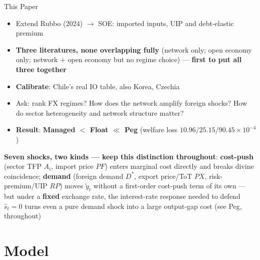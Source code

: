 \documentclass[aspectratio=43, 10pt]{beamer}
\begin{document}
\begin{frame}{This Paper}

{\small
\begin{itemize}\setlength{\itemsep}{6pt}
\item Extend Rubbo (2024) $\to$ SOE: imported inputs, UIP and debt-elastic premium
\item \textbf{Three literatures, none overlapping fully} (network only; open economy only; network $+$ open economy but no regime choice) --- \textbf{first to put all three together}
\item \textbf{Calibrate}: Chile's real IO table, also Korea, Czechia
\item Ask: rank FX regimes? How does the network amplify foreign shocks? How do sector heterogeneity and network structure matter?
\item \textbf{Result}: \textbf{Managed $<$ Float $\ll$ Peg} (welfare loss $10.96/25.15/90.45\times10^{-4}$)
\end{itemize}}

\vspace{4pt}
{\scriptsize \textbf{Seven shocks, two kinds --- keep this distinction throughout}: \textbf{cost-push} (sector TFP $A_i$, import price $PF$) enters marginal cost directly and breaks divine coincidence; \textbf{demand} (foreign demand $D^*$, export price/ToT $PX$, risk-premium/UIP $RP$) moves $\tilde y_t$ without a first-order cost-push term of its own --- but under a \textbf{fixed} exchange rate, the interest-rate response needed to defend $\hat s_t{=}0$ turns even a pure demand shock into a large output-gap cost (see Peg, throughout)}

\end{frame}

\section{Model}
\end{document}
